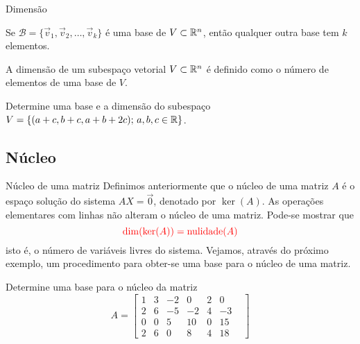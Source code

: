 \begin{frame}[label=lild]{Dimensão}

\begin{teo}
Se $\mathcal{B}=\{\vec{v}_1,\vec{v}_2,\ldots,\vec{v}_k\}$ é uma base de $V\subset\mathbb{R}^n$, então qualquer outra base tem $k$ elementos. 
\end{teo}


\begin{defin}
A {\color{blue}dimensão} de um subespaço vetorial $V\subset\mathbb{R}^n$ é definido como o número de elementos de uma base de $V$.
\end{defin}

\begin{exe}
 Determine uma base e a dimensão do subespaço $V=\{(a+c,b+c,a+b+2c);\, a,b,c\in \mathbb{R}\}$.

\end{exe}

\end{frame}





\subsection*{Núcleo}
\begin{frame}[label=lild]{Núcleo de uma matriz}
Definimos anteriormente que o {\color{blue}núcleo} de uma matriz $A$ é o espaço solução do sistema $AX=\vec{0}$, denotado por {\color{blue}$\ker(A)$}. {\color{blue}As operações elementares com linhas não alteram o núcleo de uma matriz}. Pode-se mostrar que 
\[{\color{red}\dim(\ker(A))=\operatorname{nulidade}(A)}\]
isto é, o número de variáveis livres do sistema. 
Vejamos, através do próximo exemplo, um procedimento para obter-se uma base para o núcleo de uma matriz.

\begin{exe}
Determine uma base para o núcleo da matriz
\[
A=\begin{bmatrix}
1 & 3 & -2 & 0 & 2 & 0\\
2 & 6 & -5 & -2& 4& -3& \\
0 & 0& 5& 10& 0 & 15\\
2 & 6& 0&  8& 4& 18
\end{bmatrix}
\]
\end{exe}


\end{frame}

